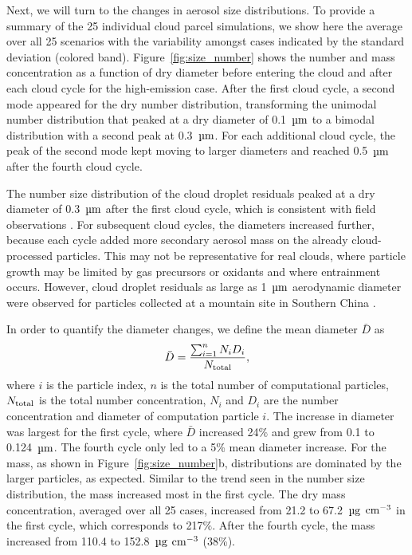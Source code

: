 \documentclass[edeposit,fullpage]{uiucthesis2009}
\begin{document}
Next, we will turn to the changes in aerosol size distributions. To
provide a summary of the 25 individual cloud parcel simulations, we
show here the average over all 25 scenarios with the variability
amongst cases indicated by the standard deviation (colored band).
Figure~\ref{fig:size_number} shows the number and mass concentration
as a function of dry diameter before entering the cloud and after each
cloud cycle for the high-emission case. After the first cloud
cycle, a second mode appeared for the dry number distribution,
transforming the unimodal number distribution that peaked at a dry
diameter of 0.1~$\rm \mu m$ to a bimodal distribution with a second
peak at 0.3~$\rm \mu m$.  For each additional cloud cycle, the peak of
the second mode kept moving to larger diameters and reached 0.5~$\rm
\mu m$ after the fourth cloud cycle.

The number size distribution of the cloud droplet residuals
  peaked at a dry diameter of 0.3~$\rm \mu m$ after the first cloud
  cycle, which is consistent with field observations
  \citep{fast2019impact, ditas2012aerosols, ge2012effect}. For
  subsequent cloud cycles, the diameters increased further, because
  each cycle added more secondary aerosol mass on the already
  cloud-processed particles. This may not be representative for real
  clouds, where particle growth may be limited by gas precursors or
  oxidants and where entrainment occurs. However, cloud droplet
  residuals as large as 1~$\rm \mu m$ aerodynamic diameter were
  observed for particles collected at a mountain site in Southern
  China \citep{lin2017situ}.

In order to quantify the diameter changes, we define the mean diameter
$\bar{D}$ as
\begin{equation}
	\bar{D}=\frac{\sum_{i=1}^{n} N_i D_i}{N_{\rm total}},
\end{equation}
where $i$ is the particle index, $n$ is the total number of computational
particles, $N_{\rm total}$ is the total number concentration, $N_i$
and $D_i$ are the number concentration and diameter of computation
particle $i$. The increase in diameter was largest for the first
cycle, where $\bar{D}$ increased 24$\%$ and grew from 0.1 to
0.124~$\rm \mu m$. The fourth cycle only led to a 5\% mean diameter
increase. For the mass, as shown in Figure~\ref{fig:size_number}b,
distributions are dominated by the larger particles, as
expected. Similar to the trend seen in the number size distribution,
the mass increased most in the first cycle. The dry mass
  concentration, averaged over all 25 cases, increased from 21.2 to
  67.2~$\rm \mu g$ $\rm cm^{-3}$ in the first cycle, which corresponds
  to 217$\%$. After the fourth cycle, the mass increased from 110.4 to
  152.8~$\rm \mu g$ $\rm cm^{-3}$ (38\%).
\end{document}
